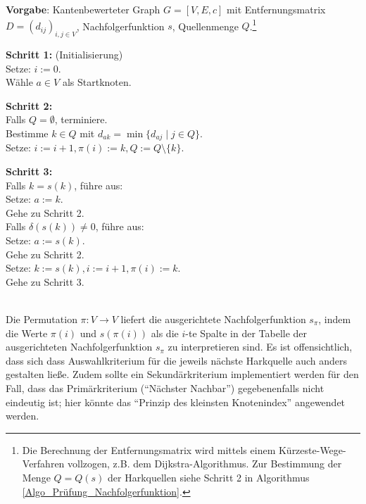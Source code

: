 \begin{algo}\label{Algo_Ausrichtung_Nachfolgerfunktion}
\textbf{Vorgabe}: Kantenbewerteter Graph $G=[V,E,c]$ mit Entfernungsmatrix $D = (d_{ij})_{i,j \in V}$, Nachfolgerfunktion $s$, Quellenmenge $Q$.\footnote{Die Berechnung der Entfernungsmatrix wird mittels einem Kürzeste-Wege-Verfahren vollzogen, z.B. dem Dijkstra-Algorithmus. Zur Bestimmung der Menge $Q=Q(s)$ der Harkquellen siehe Schritt 2 in Algorithmus \ref{Algo_Prüfung_Nachfolgerfunktion}.}

\noindent 
\textbf{Schritt 1:} (Initialisierung)\\
\phantom \quad Setze: $i := 0$. \\
\phantom \quad Wähle $a \in V$ als Startknoten. 

\noindent 
\textbf{Schritt 2:}\\
\phantom \quad Falls $Q = \emptyset$, terminiere. \\
\phantom \quad Bestimme $k \in Q$ mit $d_{ak} = \min\{d_{aj} \mid j \in Q\}$.\\
\phantom \quad Setze: $i := i+1, \pi(i) := k, Q := Q\setminus \{k\}$.

\noindent 
\textbf{Schritt 3:}\\
\phantom \quad Falls $k = s(k)$, führe aus:\\
\phantom \quad \qquad Setze: $a := k$.\\
\phantom \quad \qquad Gehe zu Schritt 2.\\
\phantom \quad Falls $\delta(s(k)) \neq 0$, führe aus:\\
\phantom \quad \qquad Setze: $a := s(k)$.\\
\phantom \quad \qquad Gehe zu Schritt 2.\\
\phantom \quad Setze: $k := s(k), i := i+1, \pi(i) := k$.\\
\phantom \quad Gehe zu Schritt 3.
\end{algo}

\phantom \\
\noindent Die Permutation $\pi : V \rightarrow V$ liefert die ausgerichtete Nachfolgerfunktion $s_{\pi}$, indem die Werte $\pi(i)$ und $s(\pi(i))$ als die $i$-te Spalte in der Tabelle der ausgerichteten Nachfolgerfunktion $s_{\pi}$ zu interpretieren sind. Es ist offensichtlich, dass sich dass Auswahlkriterium für die jeweils nächste Harkquelle auch anders gestalten ließe. Zudem sollte ein Sekundärkriterium implementiert werden für den Fall, dass das Primärkriterium ("`Nächster Nachbar"') gegebenenfalls nicht eindeutig ist; hier könnte das "`Prinzip des kleinsten Knotenindex"' angewendet werden.\\


